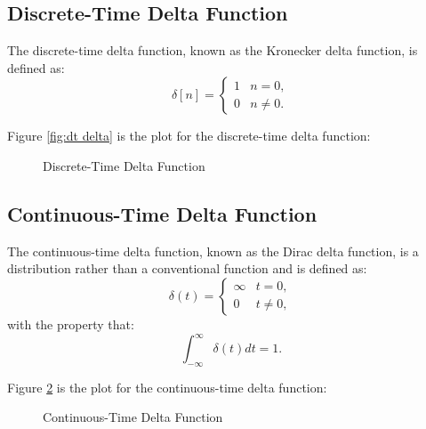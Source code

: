 \subsection{Discrete-Time Delta Function}
The discrete-time delta function, known as the Kronecker delta function, is defined as:
\[
\delta[n] =
\begin{cases}
1 & n = 0, \\
0 & n \neq 0.
\end{cases}
\]

Figure \ref{fig:dt delta} is the plot for the discrete-time delta function:

\begin{figure}[h!]
\centering
{}
\caption{Discrete-Time Delta Function}
\label{fig:dy delta}
\end{figure}

\subsection{Continuous-Time Delta Function}
The continuous-time delta function, known as the Dirac delta function, is a distribution rather than a conventional function and is defined as:
\[
\delta(t) = \begin{cases} 
\infty & t = 0, \\
0 & t \neq 0, 
\end{cases}
\]
with the property that:
\[
\int_{-\infty}^{\infty} \delta(t) dt = 1.
\]

Figure \ref{fig:ct delta} is the plot for the continuous-time delta function:

\begin{figure}[h!]
\centering
{}
\caption{Continuous-Time Delta Function}
\label{fig:ct delta}
\end{figure}